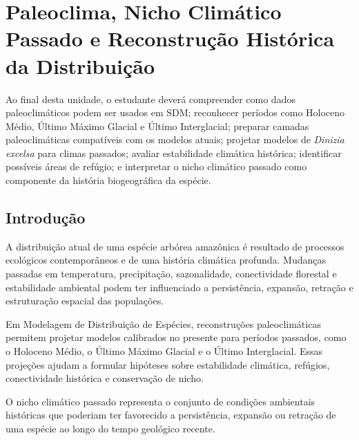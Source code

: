 \documentclass{ueap-sdm}
\begin{document}

\chapter[Paleoclima e nicho climático passado]{Paleoclima, Nicho Climático Passado e Reconstrução Histórica da Distribuição}

\begin{objetivos}
	Ao final desta unidade, o estudante deverá compreender como dados paleoclimáticos podem ser usados em SDM; reconhecer períodos como Holoceno Médio, Último Máximo Glacial e Último Interglacial; preparar camadas paleoclimáticas compatíveis com os modelos atuais; projetar modelos de \textit{Dinizia excelsa} para climas passados; avaliar estabilidade climática histórica; identificar possíveis áreas de refúgio; e interpretar o nicho climático passado como componente da história biogeográfica da espécie.
\end{objetivos}

\section{Introdução}

A distribuição atual de uma espécie arbórea amazônica é resultado de processos ecológicos contemporâneos e de uma história climática profunda. Mudanças passadas em temperatura, precipitação, sazonalidade, conectividade florestal e estabilidade ambiental podem ter influenciado a persistência, expansão, retração e estruturação espacial das populações.

Em Modelagem de Distribuição de Espécies, reconstruções paleoclimáticas permitem projetar modelos calibrados no presente para períodos passados, como o Holoceno Médio, o Último Máximo Glacial e o Último Interglacial. Essas projeções ajudam a formular hipóteses sobre estabilidade climática, refúgios, conectividade histórica e conservação de nicho.

\begin{conceito}[title={\faBook\quad Nicho climático passado}]
	O nicho climático passado representa o conjunto de condições ambientais históricas que poderiam ter favorecido a persistência, expansão ou retração de uma espécie ao longo do tempo geológico recente.
\end{conceito}

\end{document}
